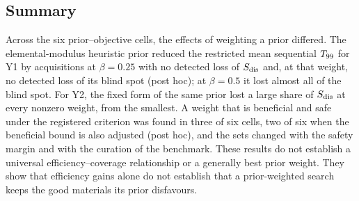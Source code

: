 \subsection{Summary}\label{sec:summary}
Across the six prior--objective cells, the effects of weighting a prior differed. The elemental-modulus heuristic prior reduced
the restricted mean sequential $T_{99}$ for Y1 by 
 acquisitions at $\beta=0.25$ with no detected loss of $S_{\mathrm{dis}}$ and, at that weight,
no detected loss of its blind spot (post hoc); at $\beta=0.5$ it lost almost all of the blind spot. For Y2, the fixed form of the
same prior lost a large share of $S_{\mathrm{dis}}$ at every nonzero weight, from the smallest. A weight that is beneficial and safe under the
registered criterion was found in three of six cells, two of six when the beneficial bound is also adjusted (post hoc), and the
sets changed with the safety margin and with the curation of the benchmark. These results do not establish a universal efficiency--coverage relationship or a generally best prior weight. They
show that efficiency gains alone do not establish that a prior-weighted search keeps the good materials its prior disfavours.

